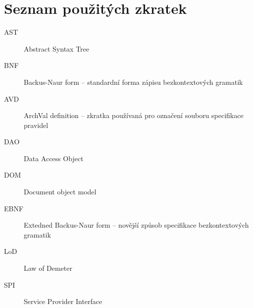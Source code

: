 \chapter{Seznam použitých zkratek}

\begin{description}
\item[AST] Abstract Syntax Tree
\item[BNF] Backus-Naur form -- standardní forma zápisu bezkontextových gramatik
\item[AVD] ArchVal definition -- zkratka používaná pro označení souboru specifikace pravidel
\item[DAO] Data Access Object
\item[DOM] Document object model
\item[EBNF] Extedned Backus-Naur form -- novější způsob specifikace bezkontextových gramatik
\item[LoD] Law of Demeter
\item[SPI] Service Provider Interface
\end{description}
